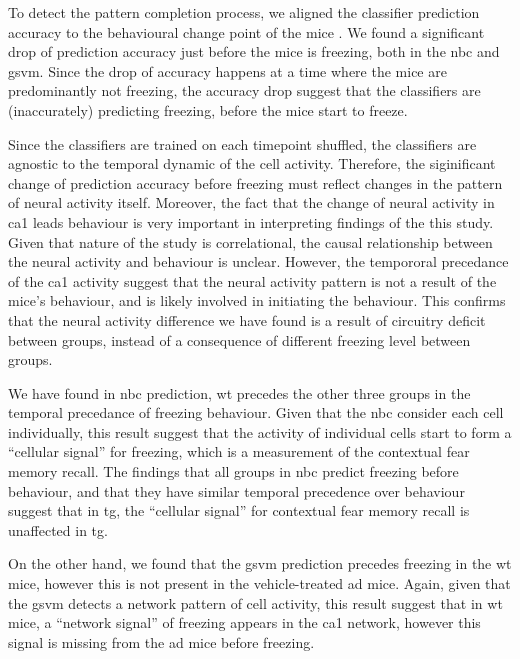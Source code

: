 To detect the pattern completion process, we aligned the classifier prediction accuracy to the behavioural change point of the mice . We found a significant drop of prediction accuracy just before the mice is freezing, both in the \gls{nbc} and \gls{gsvm}. Since the drop of accuracy happens at a time where the mice are predominantly not freezing, the accuracy drop suggest that the classifiers are (inaccurately) predicting freezing, before the mice start to freeze. 

Since the classifiers are trained on each timepoint shuffled, the classifiers are agnostic to the temporal dynamic of the cell activity. Therefore, the siginificant change of prediction accuracy before freezing must reflect changes in the pattern of neural activity itself. Moreover, the fact that the change of neural activity in \gls{ca1} leads behaviour is very important in interpreting findings of the this study. Given that nature of the study is correlational, the causal relationship between the neural activity and behaviour is unclear. However, the tempororal precedance of the \gls{ca1} activity suggest that the neural activity pattern is not a result of the mice's behaviour, and is likely involved in initiating the behaviour. This confirms that the neural activity difference we have found is a result of circuitry deficit between groups, instead of a consequence of different freezing level between groups. 

We have found in \gls{nbc} prediction, \gls{wt} precedes the other three groups in the temporal precedance of freezing behaviour. Given that the \gls{nbc} consider each cell individually, this result suggest that the activity of individual cells start to form a ``cellular signal'' for freezing, which is a measurement of the contextual fear memory recall. The findings that all groups in \gls{nbc} predict freezing before behaviour, and that they have similar temporal precedence over behaviour suggest that in \gls{tg}, the ``cellular signal'' for contextual fear memory recall is unaffected in \gls{tg}. 

On the other hand, we found that the \gls{gsvm} prediction precedes freezing in the \gls{wt} mice, however this is not present in the vehicle-treated \gls{ad} mice. Again, given that the \gls{gsvm} detects a network pattern of cell activity, this result suggest that in \gls{wt} mice, a ``network signal'' of freezing appears in the \gls{ca1} network, however this signal is missing from the \gls{ad} mice before freezing. 

